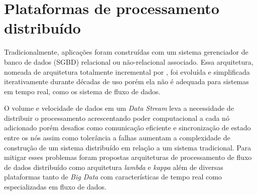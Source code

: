% 
% 


\section{Plataformas de processamento distribuído}

Tradicionalmente, aplicações foram construídas com um sistema gerenciador de
banco de dados (SGBD) relacional ou não-relacional associado. Essa arquitetura, 
nomeada de arquitetura totalmente incremental por ,
foi evoluída e simplificada iterativamente durante décadas de uso porém ela não
é adequada para sistemas em tempo real, como os sistema de fluxo de dados.

O volume e velocidade de dados em um \emph{Data Stream} leva a necessidade de
distribuir o processamento acrescentando poder computacional a cada nó
adicionado porém desafios como comunicação eficiente e sincronização de estado
entre os nós assim como tolerância a falhas aumentam a complexidade de
construção de um sistema distribuído em relação a um sistema tradicional. Para
mitigar esses problemas foram propostas arquiteturas de processamento de fluxo
de dados distribuído como arquitetura \emph{lambda} e \emph{kappa} além de
diversas plataformas tanto de \emph{Big Data} com características de tempo real
como especializadas em fluxo de dados.

